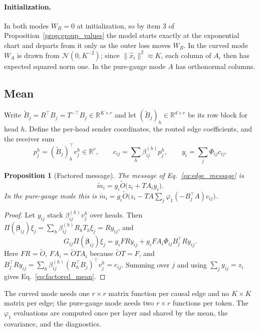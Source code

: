 \documentclass[11pt]{article}
\newtheorem{proposition}[theorem]{Proposition}
\theoremstyle{definition}
\theoremstyle{remark}
\newcommand{\R}{\mathbb R}
\newcommand{\Gauss}{\mathcal N}
\newcommand{\Ot}{\widetilde O}
\newcommand{\Bt}{\widetilde B}
\newcommand{\xh}{\hat x}
\begin{document}
\paragraph{Initialization.}
In both modes $W_B=0$ at initialization, so by item 3 of Proposition~\ref{prop:group_values} the model starts exactly at the exponential chart and departs from it only as the outer loss moves $W_B$. In the curved mode $W_A$ is drawn from $\Gauss(0,K^{-2})$; since $\|\xh_i\|^2\approx K$, each column of $A_i$ then has expected squared norm one. In the pure-gauge mode $A$ has orthonormal columns.

\subsection{Mean}

Write $\Bt_j=R^\top B_j=T^{-\top}B_j\in\R^{K\times r}$ and let $(\Bt_j)_h\in\R^{d\times r}$ be its row block for head $h$. Define the per-head sender coordinates, the routed edge coefficients, and the receiver sum
\begin{equation}
p_j^h=(\Bt_j)_h^\top v_j^h\in\R^r,\qquad c_{ij}=\sum_h\beta_{ij}^{(h)}p_j^h,\qquad y_i=\sum_j\Phi_{ij}c_{ij}.
\label{eq:mean_coefficients}
\end{equation}

\begin{proposition}[Factored message]
\label{prop:factored_mean}
The message of Eq.~\eqref{eq:edge_message} is
\begin{equation}
\tilde m_i=g_i\Ot\bigl(z_i+TA_iy_i\bigr).
\label{eq:factored_mean}
\end{equation}
In the pure-gauge mode this is $\tilde m_i=g_i\Ot\bigl(z_i-TA\sum_j\varphi_1(-B_j^\top A)c_{ij}\bigr)$.
\end{proposition}
\begin{proof}
Let $y_{ij}$ stack $\beta_{ij}^{(h)}v_j^h$ over heads. Then $\Pi(\boldsymbol\beta_{ij})\xi_j=\sum_h\beta_{ij}^{(h)}R_hT_h\xi_j=Ry_{ij}$, and
\begin{equation*}
G_{ij}\Pi(\boldsymbol\beta_{ij})\xi_j=g_iFRy_{ij}+g_iFA_i\Phi_{ij}B_j^\top Ry_{ij}.
\end{equation*}
Here $FR=\Ot$, $FA_i=\Ot TA_i$ because $\Ot T=F$, and $B_j^\top Ry_{ij}=\sum_h\beta_{ij}^{(h)}(R_h^\top B_j)^\top v_j^h=c_{ij}$. Summing over $j$ and using $\sum_jy_{ij}=z_i$ gives Eq.~\eqref{eq:factored_mean}.
\end{proof}

The curved mode needs one $r\times r$ matrix function per causal edge and no $K\times K$ matrix per edge; the pure-gauge mode needs two $r\times r$ functions per token. The $\varphi_1$ evaluations are computed once per layer and shared by the mean, the covariance, and the diagnostics.
\end{document}
